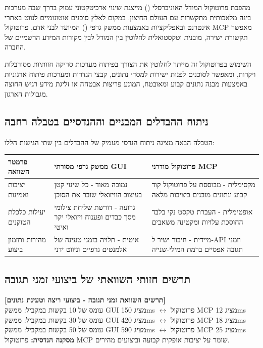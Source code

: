 \documentclass{hebrew-academic-template}
\begin{document}
מהפכת פרוטוקול המודל האוניברסלי () מייצגת שינוי ארכיטקטוני עמוק בדרך שבה מערכות בינה מלאכותית מתקשרות עם העולם החיצון. במקום לאלץ סוכנים אוטונומיים לנווט באתרי אינטרנט ובאפליקציות באמצעות ממשק גרפי () המיועד לבני אדם, פרוטוקול MCP מאפשר תקשורת ישירה, מובנית וטקסטואלית לחלוטין בין המודל לבין מקורות המידע הרשמיים של החברה.

השימוש בפרוטוקול זה מייתר לחלוטין את הצורך בפיתוח מערכות סריקה חזותיות מסורבלות ויקרות, ומאפשר לסוכנים לפנות ישירות למסדי נתונים, קבצי הגדרות ומערכות פיתוח ארגוניות באמצעות מבנה נתונים קבוע ומאובטח, המונע פריצות אבטחה או זליגת מידע רגיש החוצה מגבולות הארגון.

\subsection{ניתוח ההבדלים המבניים וההנדסיים בטבלה רחבה}
 הטבלה הבאה מציגה ניתוח הנדסי מעמיק של ההבדלים בין שתי הגישות הללו:
\begin{center}
\begin{tabularx}{\linewidth}{|X|X|X|}
\hline
\textbf{פרמטר השוואה} & \textbf{ממשק גרפי מסורתי GUI} & \textbf{פרוטוקול מודרני MCP} \\ \hline
יציבות ואמינות & נמוכה מאוד - כל שינוי קטן בעיצוב הוויזואלי שובר את הסוכן & מקסימלית - מבוססת על פרוטוקול קוד קבוע ונתונים מובנים ביציבות מלאה \\ \hline
יעילות כלכלת הטוקנים & גרועה - דורשת שליחת צילומי מסך כבדים ופענוח ויזואלי יקר ואיטי & אופטימלית - העברת טקסט נקי בלבד החוסכת עלויות ומקטינה משאבים \\ \hline
מהירות ותזמון ביצוע & איטית - תלויה בזמני טעינה של אלמנטים גרפיים וניווט ידני & מיידית - חיבור ישיר ל-API וזמני תגובה אפסיים ברמת המילי-שנייה \\ \hline
\end{tabularx}
\end{center}

\subsection{תרשים חזותי השוואתי של ביצועי זמני תגובה}
\begin{notebox}
\centering
\textbf{[תרשים השוואת זמני תגובה - ביצועי ריצה וטעינת נתונים]} \\
עומס של 10 בקשות במקביל: ממשק GUI מציג 150ms $\leftrightarrow$ פרוטוקול MCP מציג 12ms \\
עומס של 30 בקשות במקביל: ממשק GUI מציג 420ms $\leftrightarrow$ פרוטוקול MCP מציג 18ms \\
עומס של 50 בקשות במקביל: ממשק GUI מציג 590ms $\leftrightarrow$ פרוטוקול MCP מציג 25ms \\
\textbf{מסקנה הנדסית:} פרוטוקול MCP שומר על יציבות אופקית קבועה וביצועים מהירים.
\end{notebox}
\end{document}
